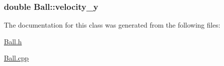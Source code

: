 \hypertarget{classBall_aeadbe78353c1ea96e9cc0756ff7613fa}{
\subsubsection[{velocity\+\_\+y}]{\setlength{\rightskip}{0pt plus 5cm}double Ball\+::velocity\+\_\+y\hspace{0.3cm}{\ttfamily [private]}}}\label{classBall_aeadbe78353c1ea96e9cc0756ff7613fa}


The documentation for this class was generated from the following files\+:\begin{DoxyCompactItemize}
\item 
\hyperlink{Ball_8h}{Ball.\+h}\item 
\hyperlink{Ball_8cpp}{Ball.\+cpp}\end{DoxyCompactItemize}

